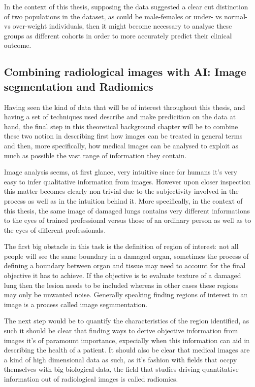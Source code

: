 In the context of this thesis, supposing the data suggested a clear cut distinction of two populations in the dataset, as could be male-females or under- vs  normal- vs over-weight individuals, then it might become necessary to analyse these groups as different  cohorts in order to more accurately predict their clinical outcome.


\subsection{Combining radiological images  with AI: Image segmentation and Radiomics}
Having seen the kind of data that will be of interest throughout this thesis, and having a set of techniques used describe and make predicition on the data at hand, the final step in this theoretical background chapter will be to combine these two notion in describing first how images can be treated in general terms and then, more specifically, how medical images can be analysed to exploit as much as possible the vast range of information they contain.

Image analysis seems, at first glance, very intuitive since for humans it's very easy to infer qualitative information from images. However upon closer inspection this matter becomes clearly non trivial due to the subjectivity involved in the process as well as in the intuition behind it. More specifically, in the context of this thesis, the same image of damaged lungs contains very different informations to the eyes of trained professional versus those of an ordinary person as well as to the eyes of different professionals.

The first big obstacle in this task is the definition of region of interest: not all people will see the same boundary in a damaged organ, sometimes the process of defining a boundary between organ and tissue may need to account for the final objective it has to achieve. If the objective is to evaluate texture of a damaged lung then the lesion needs to be included whereas in other cases these regions may only be unwanted noise. Generally speaking finding regions of interest in an image is a process called image segmmentation.

The next step would be to quantify the characteristics of the region identified, as such it should be clear that finding ways to derive objective information from images it's of paramount importance, expecially when this information can aid in describing the health of a patient. It should also be clear that medical images are a kind of high dimensional data as such, as it's fashion with fields that occpy themselves with big biological data, the field that studies driving quantitative information out of radiological images is called radiomics.

